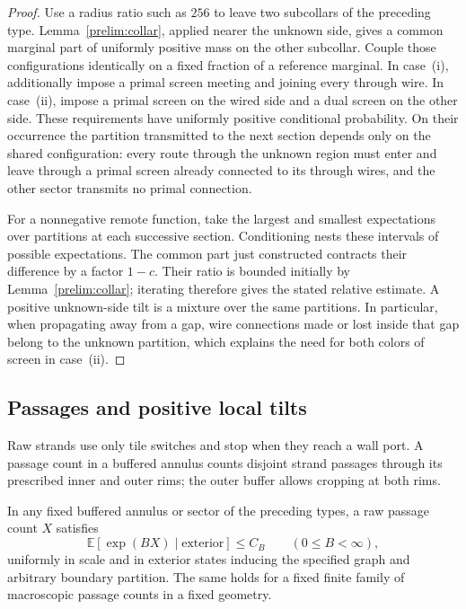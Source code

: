 \begin{proof}
Use a radius ratio such as $256$ to leave two subcollars of the preceding
type. Lemma~\ref{prelim:collar}, applied nearer the unknown side, gives a
common marginal part of uniformly positive mass on the other subcollar.
Couple those configurations identically on a fixed fraction of a
reference marginal. In case~(i), additionally impose a primal screen
meeting and joining every through wire. In case~(ii), impose a primal
screen on the wired side and a dual screen on the other side. These
requirements have uniformly positive conditional probability. On their
occurrence the partition transmitted to the next section depends only
on the shared configuration: every route through the unknown region
must enter and leave through a primal screen already connected to its
through wires, and the other sector transmits no primal connection.

For a nonnegative remote function, take the largest and smallest
expectations over partitions at each successive section. Conditioning
nests these intervals of possible expectations. The common part just
constructed contracts their difference by a factor $1-c$. Their ratio
is bounded initially by Lemma~\ref{prelim:collar}; iterating therefore
gives the stated relative estimate. A positive unknown-side tilt is a
mixture over the same partitions. In particular, when propagating away
from a gap, wire connections made or lost inside that gap belong to the
unknown partition, which explains the need for both colors of screen
in case~(ii).
\end{proof}

\subsection{Passages and positive local tilts}

Raw strands use only tile switches and stop when they reach a wall port.
A passage count in a buffered annulus counts disjoint strand passages
through its prescribed inner and outer rims; the outer buffer allows
cropping at both rims.

\begin{lemma}\label{prelim:passages}
In any fixed buffered annulus or sector of the preceding types, a raw
passage count $X$ satisfies
\begin{equation}\label{prelim:passage-moment}
 \mathbb E[\exp(BX)\mid\text{exterior}]\le C_B
 \qquad(0\le B<\infty),
\end{equation}
uniformly in scale and in exterior states inducing the specified graph
and arbitrary boundary partition. The same holds for a fixed finite
family of macroscopic passage counts in a fixed geometry.
\end{lemma}

